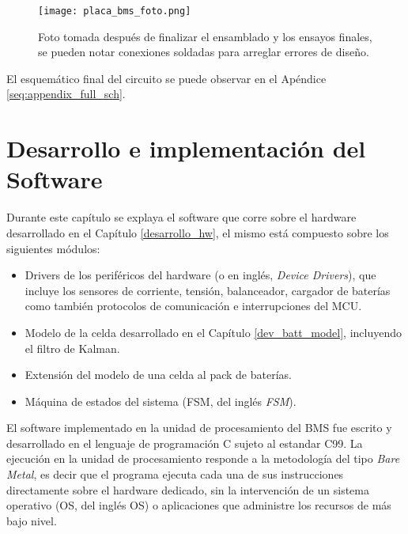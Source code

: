 \documentclass[10pt, a4paper]{report}
\begin{document}
\begin{figure}[h!]
    \begin{center}
        \texttt{[image: placa\_bms\_foto.png]}
        \caption{Foto tomada despu\'es de finalizar el ensamblado y los ensayos
        finales, se pueden notar conexiones soldadas para arreglar errores de
        diseño.}
   		 \label{placa_bms_fotografia}
    \end{center}
\end{figure}

El esquem\'atico final del circuito se puede observar en el Ap\'endice 
\ref{seq:appendix_full_sch}.

\newpage

\chapter{Desarrollo e implementaci\'on del Software}\label{software_implementation}
\thispagestyle{fancy}

Durante este cap\'itulo se explaya el software que corre sobre el hardware
desarrollado en el Cap\'itulo \ref{desarrollo_hw}, el mismo est\'a compuesto 
sobre los siguientes m\'odulos:

\begin{itemize}
    \item Drivers de los perif\'ericos del hardware (o en ingl\'es, \emph{Device
        Drivers}), que incluye los sensores de corriente, tensi\'on,
        balanceador, cargador de bater\'ias como tambi\'en protocolos de
        comunicaci\'on e interrupciones del \acrshort{MCU}.
    \item Modelo de la celda desarrollado en el Cap\'itulo \ref{dev_batt_model},
        incluyendo el filtro de Kalman.
    \item Extensi\'on del modelo de una celda al pack de bater\'ias.
    \item M\'aquina de estados del sistema (\acrshort{FSM}, del ingl\'es
        \emph{\acrlong{FSM}}).
\end{itemize}

El software implementado en la unidad de procesamiento del \acrshort{BMS} fue
escrito y desarrollado en el lenguaje de programación C sujeto al estandar C99.
La ejecución en la unidad de procesamiento responde a la metodología del tipo
\emph{Bare Metal}, es decir que el programa ejecuta cada una de sus
instrucciones directamente sobre el hardware dedicado, sin la intervención de
un sistema operativo (\acrshort{OS}, del ingl\'es \acrlong{OS}) o aplicaciones 
que administre los recursos de más bajo nivel.
\end{document}
